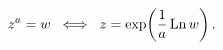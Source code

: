 \[z^{a}=w\;\;\Longleftrightarrow\;\;z=\mathop{\exp\/}\nolimits\!\left(\frac{1}{a%
}\mathop{\mathrm{Ln}\/}\nolimits w\right).\]